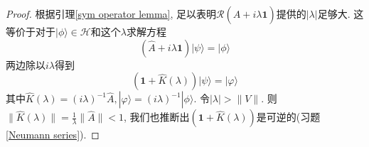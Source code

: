 \documentclass[a4paper,11pt]{article}
\newtheorem{proof}{证明}[section]
\begin{document}
\begin{proof}
  根据引理\ref{sym operator lemma}, 足以表明$\mathcal{R}(\hat{A}+i\lambda\mathbf{1})$提供的$|\lambda|$足够大. 这等价于对于$|\phi\rangle\in\mathcal{H}$和这个$\lambda$求解方程
\begin{equation*}
  (\hat{A}+i\lambda\mathbf{1})|\psi\rangle=|\phi\rangle
\end{equation*}
两边除以$i\lambda$得到
\begin{equation*}
  (\mathbf{1}+\hat{K}(\lambda))|\psi\rangle=|\varphi\rangle
\end{equation*}
其中$\hat{K}(\lambda)=(i\lambda)^{-1}\hat{A}, |\varphi\rangle=(i\lambda)^{-1}|\phi\rangle$. 令$|\lambda|>\|V\|$. 则$\|\hat{K}(\lambda)\|=\frac{1}{\lambda}\|\hat{A}\|<1$, 我们也推断出$(\mathbf{1}+\hat{K}(\lambda))$是可逆的(习题\ref{Neumann series}).
\end{proof}
\end{document}
